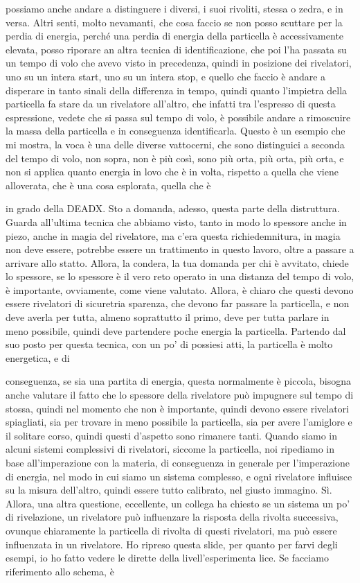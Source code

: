 {possiamo anche andare a distinguere i diversi, i suoi rivoliti, stessa o zedra, e in versa. Altri senti, molto nevamanti, che cosa faccio se non posso scuttare per la perdia di energia, perché una perdia di energia della particella è accessivamente elevata, posso riporare an altra tecnica di identificazione, che poi l'ha passata su un tempo di volo che avevo visto in precedenza, quindi in posizione dei rivelatori, uno su un intera start, uno su un intera stop, e quello che faccio è andare a disperare in tanto sinali della differenza in tempo, quindi quanto l'impietra della particella fa stare da un rivelatore all'altro, che infatti tra l'espresso di questa espressione, vedete che si passa sul tempo di volo, è possibile andare a rimoscuire la massa della particella e in conseguenza identificarla. Questo è un esempio che mi mostra, la voca è una delle diverse vattocerni, che sono distinguici a seconda del tempo di volo, non sopra, non è più così, sono più orta, più orta, più orta, e non si applica quanto energia in lovo che è in volta, rispetto a quella che viene alloverata, che è una cosa esplorata, quella che è 

in grado della DEADX. Sto a domanda, adesso, questa parte della distruttura. Guarda all'ultima tecnica che abbiamo visto, tanto in modo lo spessore anche in piezo, anche in magia del rivelatore, ma c'era questa richiedemnitura, in magia non deve essere, potrebbe essere un trattimento in questo lavoro, oltre a passare a arrivare allo statto. Allora, la condera, la tua domanda per chi è avvitato, chiede lo spessore, se lo spessore è il vero reto operato in una distanza del tempo di volo, è importante, ovviamente, come viene valutato. Allora, è chiaro che questi devono essere rivelatori di sicuretria sparenza, che devono far passare la particella, e non deve averla per tutta, almeno soprattutto il primo, deve per tutta parlare in meno possibile, quindi deve partendere poche energia la particella. Partendo dal suo posto per questa tecnica, con un po' di possiesi atti, la particella è molto energetica, e di 

conseguenza, se sia una partita di energia, questa normalmente è piccola, bisogna anche valutare il fatto che lo spessore della rivelatore può impugnere sul tempo di stossa, quindi nel momento che non è importante, quindi devono essere rivelatori spiagliati, sia per trovare in meno possibile la particella, sia per avere l'amiglore e il solitare corso, quindi questi d'aspetto sono rimanere tanti. Quando siamo in alcuni sistemi complessivi di rivelatori, siccome la particella, noi ripediamo in base all'imperazione con la materia, di conseguenza in generale per l'imperazione di energia, nel modo in cui siamo un sistema complesso, e ogni rivelatore influisce su la misura dell'altro, quindi essere tutto calibrato, nel giusto immagino. Sì. Allora, una altra questione, eccellente, un collega ha chiesto se un sistema un po' di rivelazione, un rivelatore può influenzare la risposta della rivolta successiva, ovunque chiaramente la particella di rivolta di questi rivelatori, ma può essere influenzata in un rivelatore. Ho ripreso questa slide, per quanto per farvi degli esempi, io ho fatto vedere le dirette della livell'esperimenta lice. Se facciamo riferimento allo schema, è 

}
